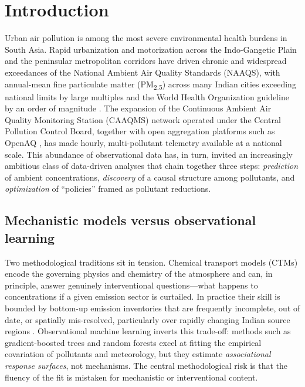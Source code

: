 \section{Introduction}
\label{sec:intro}

Urban air pollution is among the most severe environmental health burdens in South
Asia. Rapid urbanization and motorization across the Indo-Gangetic Plain and the
peninsular metropolitan corridors have driven chronic and widespread exceedances of
the National Ambient Air Quality Standards (NAAQS), with annual-mean fine particulate
matter (PM\textsubscript{2.5}) across many Indian cities exceeding national limits by
large multiples and the World Health Organization guideline by an order of magnitude
\citep{guttikunda2013delhi,pant2015delhi}. The expansion of the Continuous Ambient Air
Quality Monitoring Station (CAAQMS) network operated under the Central Pollution
Control Board, together with open aggregation platforms such as OpenAQ \citep{openaq},
has made hourly, multi-pollutant telemetry available at a national scale. This
abundance of observational data has, in turn, invited an increasingly ambitious class
of data-driven analyses that chain together three steps: \emph{prediction} of ambient
concentrations, \emph{discovery} of a causal structure among pollutants, and
\emph{optimization} of ``policies'' framed as pollutant reductions.

\subsection{Mechanistic models versus observational learning}
Two methodological traditions sit in tension. Chemical transport models (CTMs) encode
the governing physics and chemistry of the atmosphere and can, in principle, answer
genuinely interventional questions---what happens to concentrations if a given
emission sector is curtailed. In practice their skill is bounded by bottom-up emission
inventories that are frequently incomplete, out of date, or spatially mis-resolved,
particularly over rapidly changing Indian source regions \citep{guttikunda2013delhi}.
Observational machine learning inverts this trade-off: methods such as gradient-boosted
trees \citep{chen2016xgboost} and random forests \citep{breiman2001rf} excel at fitting
the empirical covariation of pollutants and meteorology, but they estimate
\emph{associational response surfaces}, not mechanisms. The central methodological risk
is that the fluency of the fit is mistaken for mechanistic or interventional content.

